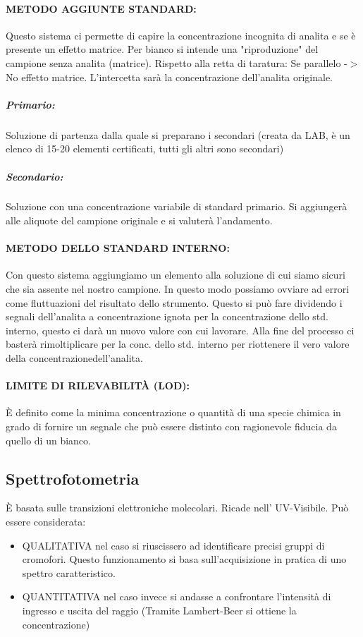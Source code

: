 \documentclass{article}
\begin{document}
\paragraph{METODO AGGIUNTE STANDARD:} Questo sistema ci permette di capire la concentrazione incognita di analita e se è presente un effetto matrice. Per bianco si intende una "riproduzione" del campione senza analita (matrice). Rispetto alla retta di taratura: Se parallelo -$>$ No effetto matrice. L'intercetta sarà la concentrazione dell'analita originale.
\subparagraph{Primario: } Soluzione di partenza dalla quale si preparano i secondari (creata da LAB, è un elenco di 15-20 elementi certificati, tutti gli altri sono secondari)
\subparagraph{Secondario: } Soluzione con una concentrazione variabile di standard primario. Si aggiungerà alle aliquote del campione originale e si valuterà l'andamento.
\paragraph{METODO DELLO STANDARD INTERNO:} Con questo sistema aggiungiamo un elemento alla soluzione di cui siamo sicuri che sia assente nel nostro campione. In questo modo possiamo ovviare ad errori come fluttuazioni del risultato dello strumento. Questo si può fare dividendo i segnali dell'analita a concentrazione ignota per la concentrazione dello std. interno, questo ci darà un nuovo valore con cui lavorare. Alla fine del processo ci basterà rimoltiplicare per la conc. dello std. interno per riottenere il vero valore della concentrazionedell'analita. 
\paragraph{LIMITE DI RILEVABILITÀ (LOD):} È definito come la minima concentrazione o quantità di una specie chimica in grado di fornire un segnale che può essere distinto con ragionevole fiducia da quello di un bianco. 

\newpage

\subsection{Spettrofotometria}
È basata sulle transizioni elettroniche molecolari. Ricade nell' UV-Visibile. Può essere considerata:
\begin{itemize}
	\item QUALITATIVA nel caso si riuscissero ad identificare precisi gruppi di cromofori. Questo funzionamento si basa sull'acquisizione in pratica di uno spettro caratteristico.
	\item QUANTITATIVA nel caso invece si andasse a confrontare l'intensità di ingresso e uscita del raggio (Tramite Lambert-Beer si ottiene la concentrazione)  
\end{itemize} 
\end{document}
